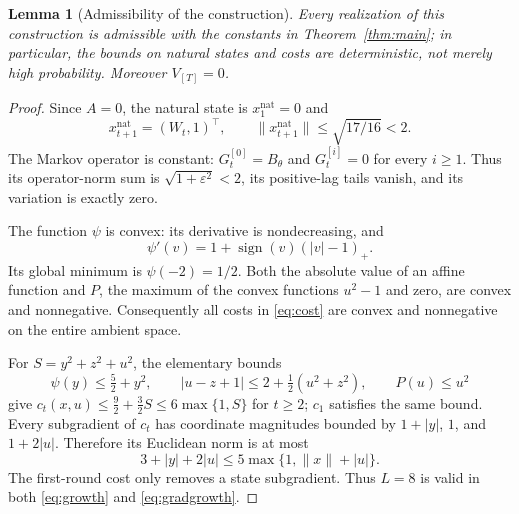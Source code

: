 \documentclass[11pt]{article}
\newtheorem{lemma}[theorem]{Lemma}
\theoremstyle{remark}
\newcommand{\nat}{\mathrm{nat}}
\begin{document}
\begin{lemma}[Admissibility of the construction]\label{lem:admissible}
Every realization of this construction is admissible with the constants in Theorem~\ref{thm:main}; in particular, the bounds on natural states and costs are deterministic, not merely high probability. Moreover $V_{[T]}=0$.
\end{lemma}
\begin{proof}
Since $A=0$, the natural state is $x_1^{\nat}=0$ and
\[
 x_{t+1}^{\nat}=(W_t,1)^\top,
 \qquad \|x_{t+1}^{\nat}\|\le\sqrt{17/16}<2.
\]
The Markov operator is constant: $G_t^{[0]}=B_\theta$ and $G_t^{[i]}=0$ for every $i\ge1$. Thus its operator-norm sum is $\sqrt{1+\varepsilon^2}<2$, its positive-lag tails vanish, and its variation is exactly zero.

The function $\psi$ is convex: its derivative is nondecreasing, and
\[
 \psi'(v)=1+\operatorname{sign}(v)(|v|-1)_+.
\]
Its global minimum is $\psi(-2)=1/2$. Both the absolute value of an affine function and $P$, the maximum of the convex functions $u^2-1$ and zero, are convex and nonnegative. Consequently all costs in \eqref{eq:cost} are convex and nonnegative on the entire ambient space.

For $S=y^2+z^2+u^2$, the elementary bounds
\[
 \psi(y)\le\tfrac52+y^2,\qquad
 |u-z+1|\le 2+\tfrac12(u^2+z^2),\qquad P(u)\le u^2
\]
give $c_t(x,u)\le\tfrac92+\tfrac32S\le6\max\{1,S\}$ for $t\ge2$; $c_1$ satisfies the same bound. Every subgradient of $c_t$ has coordinate magnitudes bounded by $1+|y|$, $1$, and $1+2|u|$. Therefore its Euclidean norm is at most
\[
 3+|y|+2|u|\le5\max\{1,\|x\|+|u|\}.
\]
The first-round cost only removes a state subgradient. Thus $L=8$ is valid in both \eqref{eq:growth} and \eqref{eq:gradgrowth}.
\end{proof}
\end{document}
